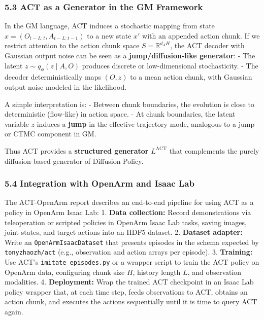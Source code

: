 \documentclass[
]{article}
\theoremstyle{remark}
\begin{document}
\subsubsection{5.3 ACT as a Generator in the GM
Framework}\label{act-as-a-generator-in-the-gm-framework}

In the GM language, ACT induces a stochastic mapping from state
\(x = (O_{t-L:t}, A_{t-L:t-1})\) to a new state \(x'\) with an appended
action chunk. If we restrict attention to the action chunk space
\(S = \mathbb{R}^{d_A H}\), the ACT decoder with Gaussian output noise
can be seen as a \textbf{jump/diffusion-like
generator}: \cite{act2023,gm-companion-notes,gm2025} - The latent
\(z \sim q_\phi(z \mid A,O)\) produces discrete or low-dimensional
stochasticity. - The decoder deterministically maps \((O,z)\) to a mean
action chunk, with Gaussian output noise modeled in the likelihood.

A simple interpretation is: - Between chunk boundaries, the evolution is
close to deterministic (flow-like) in action space. - At chunk
boundaries, the latent variable \(z\) induces a \textbf{jump} in the
effective trajectory mode, analogous to a jump or CTMC component in
GM. \cite{gm2025}

Thus ACT provides a \textbf{structured generator} \(L^{\text{ACT}}\)
that complements the purely diffusion-based generator of Diffusion
Policy. \cite{act-project-page,act2023,gm-companion-notes,gm2025}

\subsubsection{5.4 Integration with OpenArm and Isaac
Lab}\label{integration-with-openarm-and-isaac-lab}

The ACT-OpenArm report describes an end-to-end pipeline for using ACT as
a policy in OpenArm Isaac Lab: \cite{act-openarm-notes} 1. \textbf{Data collection:}
Record demonstrations via teleoperation or scripted policies in OpenArm
Isaac Lab tasks, saving images, joint states, and target actions into an
HDF5 dataset. \cite{act-openarm-notes} 2. \textbf{Dataset adapter:} Write an
\texttt{OpenArmIsaacDataset} that presents episodes in the schema
expected by \texttt{tonyzhaozh/act} (e.g., observation and action arrays
per episode). \cite{act-project-page,act-openarm-notes} 3. \textbf{Training:} Use ACT's
\texttt{imitate\_episodes.py} or a wrapper script to train the ACT
policy on OpenArm data, configuring chunk size \(H\), history length
\(L\), and observation modalities. \cite{act-hf-summary,act-openarm-notes} 4.
\textbf{Deployment:} Wrap the trained ACT checkpoint in an Isaac Lab
policy wrapper that, at each time step, feeds observations to ACT,
obtains an action chunk, and executes the actions sequentially until it
is time to query ACT again. \cite{act-openarm-notes}
\end{document}
